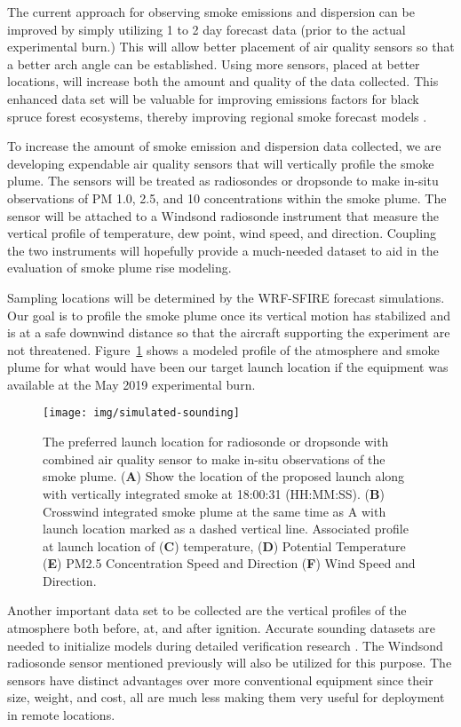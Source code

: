 \documentclass[preprints,article,accept,moreauthors,pdftex]{Definitions/mdpi}
\begin{document}
The current approach for observing smoke emissions and dispersion can be improved by simply utilizing 1 to 2 day forecast data (prior to the actual experimental burn.) This will allow better placement of air quality sensors so that a better arch angle can be established. Using more sensors, placed at better locations, will increase both the amount and quality of the data collected. This enhanced data set will be valuable for improving emissions factors for black spruce forest ecosystems, thereby improving regional smoke forecast models \cite{prichard_wildland_2020}.

To increase the amount of smoke emission and dispersion data collected, we are developing expendable air quality sensors that will vertically profile the smoke plume. The sensors will be treated as radiosondes or dropsonde to make in-situ observations of PM 1.0, 2.5, and 10 concentrations within the smoke plume. The sensor will be attached to a Windsond radiosonde instrument \cite{bessardon_evaluation_2019} that measure the vertical profile of temperature, dew point, wind speed, and direction. Coupling the two instruments will hopefully provide a much-needed dataset to aid in the evaluation of smoke plume rise modeling.

Sampling locations will be determined by the WRF-SFIRE forecast simulations. Our goal is to profile the smoke plume once its vertical motion has stabilized and is at a safe downwind distance so that the aircraft supporting the experiment are not threatened. Figure~\ref{fig8} shows a modeled profile of the atmosphere and smoke plume for what would have been our target launch location if the equipment was available at the May 2019 experimental burn.

\begin{figure}[H]
\centering
 \texttt{[image: img/simulated-sounding]}
 \caption{The preferred launch location for radiosonde or dropsonde with combined air quality sensor to make in-situ observations of the smoke plume. (\textbf{A}) Show the location of the proposed launch along with vertically integrated smoke at 18:00:31 (HH:MM:SS). (\textbf{B}) Crosswind integrated smoke plume at the same time as A with launch location marked as a dashed vertical line. Associated profile at launch location of (\textbf{C}) temperature, (\textbf{D}) Potential Temperature (\textbf{E}) PM2.5 Concentration Speed and Direction (\textbf{F}) Wind Speed and Direction. \label{fig8}}
 \end{figure}

Another important data set to be collected are the vertical profiles of the atmosphere both before, at, and after ignition. Accurate sounding datasets are needed to initialize models during detailed verification research \cite{kochanski_experimental_2018,moisseeva_capturing_2019}. The Windsond radiosonde sensor mentioned previously will also be utilized for this purpose. The sensors have distinct advantages over more conventional equipment since their size, weight, and cost, all are much less making them very useful for deployment in remote locations.
\end{document}
